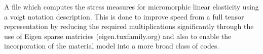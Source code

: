 A file which computes the stress measures for micromorphic linear elasticity using a voigt notation description. This is done to improve speed from a full tensor representation by reducing the required multiplications significantly through the use of Eigen sparse matricies (eigen.tuxfamily.org) and also to enable the incorporation of the material model into a more broad class of codes.
